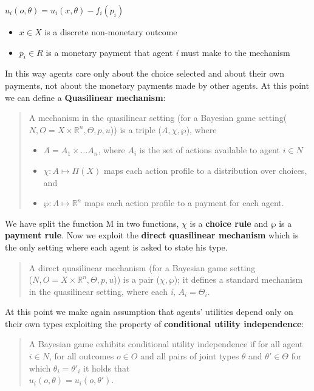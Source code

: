 \documentclass{article}
\begin{document}
{\begin{center}
    $u_i(o,\theta) = u_i(x,\theta) - f_i(p_i)$
    \begin{itemize}
        \item $x \in X$ is a discrete non-monetary outcome
        \item $p_i \in R$ is a monetary payment that agent \textit{i} must make to the mechanism
    \end{itemize}
\end{center}
In this way agents care only about the choice selected and about their own payments, not about the monetary payments made by other agents. At this point we can define a \textbf{Quasilinear mechanism}:
\begin{quote}
    A mechanism in the quasilinear setting (for a Bayesian game setting($N,O = X \times \mathbb{R}^n,\Theta,p,u$)) is a triple ($A,\chi,\wp$), where
    \begin{itemize}
        \item $A = A_1 \times \dots A_n$, where $A_i$ is the set of actions available to agent $i \in N$
        \item $\chi : A \mapsto \Pi(X)$ maps each action profile to a distribution over choices, and
        \item $\wp : A \mapsto \mathbb{R}^n$ maps each action profile to a payment for each agent.
    \end{itemize}
\end{quote}
We have split the function M in two functions, $\chi$ is a \textbf{choice rule} and $\wp$ is a \textbf{payment rule}. Now we exploit the \textbf{direct quasilinear mechanism} which is the only setting where each agent is asked to state his type.
\begin{quote}
    A direct quasilinear mechanism (for a Bayesian game setting\\($N,O = X \times \mathbb{R}^n,\Theta,p,u$)) is a pair ($\chi,\wp$); it defines a standard mechanism in the quasilinear setting, where each \textit{i}, $A_i = \Theta_i$.
\end{quote}
At this point we make again assumption that agents' utilities depend only on their own types exploiting the property of \textbf{conditional utility independence}:
\begin{quote}
    A Bayesian game exhibits conditional utility independence if for all agent $i \in N$, for all outcomes $o \in O$ and all pairs of joint types $\theta$ and $\theta' \in \Theta$ for which $\theta_i = \theta'_i$ it holds that \\ $u_i(o,\theta) = u_i(o,\theta')$. 

\end{quote}}
\end{document}
